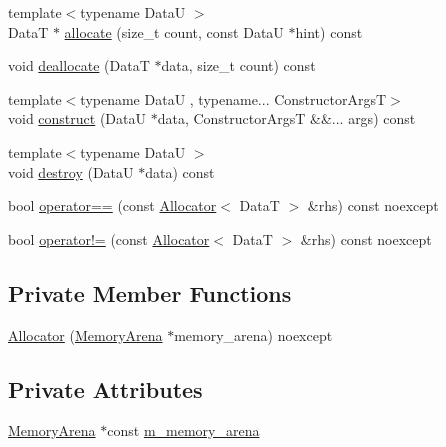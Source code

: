 \begin{DoxyCompactItemize}
\item 
{\footnotesize template$<$typename DataU $>$ }\\DataT $\ast$ \hyperlink{structmage_1_1_memory_arena_1_1_allocator_a41289f8e34edc9f79e427b819af6b8eb}{allocate} (size\+\_\+t count, const DataU $\ast$hint) const
\item 
void \hyperlink{structmage_1_1_memory_arena_1_1_allocator_ad46daec4462fc4b37f5422f4ad263894}{deallocate} (DataT $\ast$data, size\+\_\+t count) const
\item 
{\footnotesize template$<$typename DataU , typename... Constructor\+ArgsT$>$ }\\void \hyperlink{structmage_1_1_memory_arena_1_1_allocator_a129048e929be140b41279ea1593a2333}{construct} (DataU $\ast$data, Constructor\+ArgsT \&\&... args) const
\item 
{\footnotesize template$<$typename DataU $>$ }\\void \hyperlink{structmage_1_1_memory_arena_1_1_allocator_a17aa35d167f5c5d7fa8b65c889df9484}{destroy} (DataU $\ast$data) const
\item 
bool \hyperlink{structmage_1_1_memory_arena_1_1_allocator_ad76b72baf40d1bfcd233f5cac1f6b4a7}{operator==} (const \hyperlink{structmage_1_1_memory_arena_1_1_allocator}{Allocator}$<$ DataT $>$ \&rhs) const noexcept
\item 
bool \hyperlink{structmage_1_1_memory_arena_1_1_allocator_a2fa34993d2d65722e5bc2db1ed4c3536}{operator!=} (const \hyperlink{structmage_1_1_memory_arena_1_1_allocator}{Allocator}$<$ DataT $>$ \&rhs) const noexcept
\end{DoxyCompactItemize}
\subsection*{Private Member Functions}
\begin{DoxyCompactItemize}
\item 
\hyperlink{structmage_1_1_memory_arena_1_1_allocator_a10a6ea82aab121d4e04efa004a49910b}{Allocator} (\hyperlink{classmage_1_1_memory_arena}{Memory\+Arena} $\ast$memory\+\_\+arena) noexcept
\end{DoxyCompactItemize}
\subsection*{Private Attributes}
\begin{DoxyCompactItemize}
\item 
\hyperlink{classmage_1_1_memory_arena}{Memory\+Arena} $\ast$const \hyperlink{structmage_1_1_memory_arena_1_1_allocator_a821cb29f5f5c5d1581f87e9dac143d53}{m\+\_\+memory\+\_\+arena}
\end{DoxyCompactItemize}
